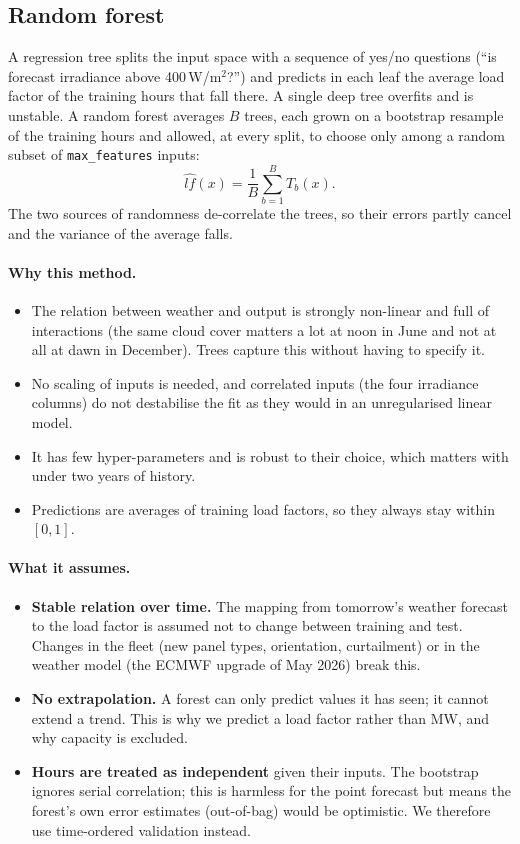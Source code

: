 \documentclass[11pt,a4paper]{article}
\newcommand{\lf}{\ensuremath{\mathit{lf}}}
\begin{document}
\subsection{Random forest}

A regression tree splits the input space with a sequence of yes/no questions (``is forecast
irradiance above 400\,W/m$^2$?'') and predicts in each leaf the average load factor of the training
hours that fall there. A single deep tree overfits and is unstable. A random forest averages $B$
trees, each grown on a bootstrap resample of the training hours and allowed, at every split, to
choose only among a random subset of \texttt{max\_features} inputs:
\[
  \widehat{\lf}(x) = \frac{1}{B}\sum_{b=1}^{B} T_b(x).
\]
The two sources of randomness de-correlate the trees, so their errors partly cancel and the
variance of the average falls.

\paragraph{Why this method.}
\begin{itemize}
  \item The relation between weather and output is strongly non-linear and full of interactions
  (the same cloud cover matters a lot at noon in June and not at all at dawn in December). Trees
  capture this without having to specify it.
  \item No scaling of inputs is needed, and correlated inputs (the four irradiance columns) do not
  destabilise the fit as they would in an unregularised linear model.
  \item It has few hyper-parameters and is robust to their choice, which matters with under two
  years of history.
  \item Predictions are averages of training load factors, so they always stay within $[0, 1]$.
\end{itemize}

\paragraph{What it assumes.}
\begin{itemize}
  \item \textbf{Stable relation over time.} The mapping from tomorrow's weather forecast to the load
  factor is assumed not to change between training and test. Changes in the fleet (new panel types,
  orientation, curtailment) or in the weather model (the ECMWF upgrade of May 2026) break this.
  \item \textbf{No extrapolation.} A forest can only predict values it has seen; it cannot extend a
  trend. This is why we predict a load factor rather than MW, and why capacity is excluded.
  \item \textbf{Hours are treated as independent} given their inputs. The bootstrap ignores serial
  correlation; this is harmless for the point forecast but means the forest's own error estimates
  (out-of-bag) would be optimistic. We therefore use time-ordered validation instead.
\end{itemize}
\end{document}
